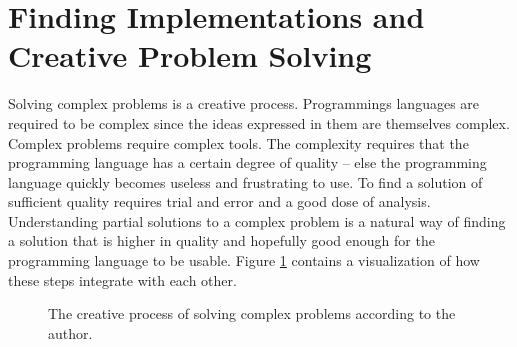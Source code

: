 \section{Finding Implementations and Creative Problem Solving}
Solving complex problems is a creative process. Programmings languages are required to be complex since the ideas expressed in them are themselves complex. Complex problems require complex tools. The complexity requires that the programming language
has a certain degree of quality -- else the programming language quickly becomes useless and frustrating to use. To find a solution of sufficient quality requires trial and error and a good dose of analysis. Understanding partial solutions to a complex problem is a natural way of finding a solution that is higher in quality and hopefully good enough for the programming language to be usable. Figure \ref{figCreativeProcess} contains a visualization of how these steps integrate with each other.

\begin{center}
\begin{figure}[h!]
\centering
{}
\caption{The creative process of solving complex problems according to the author.}
\label{figCreativeProcess}
\end{figure}
\end{center}
